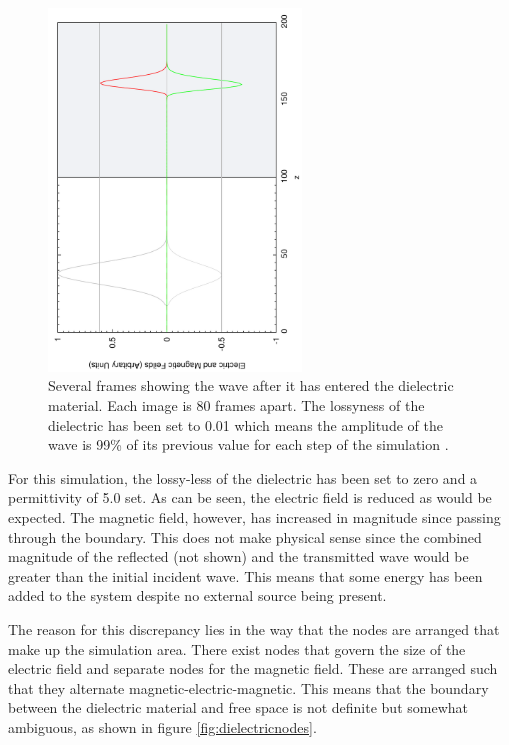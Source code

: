 \begin{figure}[ht]
    \centering
    \includegraphics[angle=270, width=0.6\textwidth]{magneticgain.pdf}
    \caption{Several frames showing the wave after it has entered the dielectric material. Each image is 80 frames apart. The lossyness of the dielectric has been set to 0.01 which means the amplitude of the wave is 99\% of its previous value for each step of the simulation .}\label{fig:magneticgain}
\end{figure}

For this simulation, the lossy-less of the dielectric has been set to zero and a permittivity of 5.0 set. As can be seen, the electric field is reduced as would be expected. The magnetic field, however, has increased in magnitude since passing through the boundary. This does not make physical sense since the combined magnitude of the reflected (not shown) and the transmitted wave would be greater than the initial incident wave. This means that some energy has been added to the system despite no external source being present.

The reason for this discrepancy lies in the way that the nodes are arranged that make up the simulation area. There exist nodes that govern the size of the electric field and separate nodes for the magnetic field. These are arranged such that they alternate magnetic-electric-magnetic. This means that the boundary between the dielectric material and free space is not definite but somewhat ambiguous, as shown in figure \ref{fig:dielectricnodes}.

